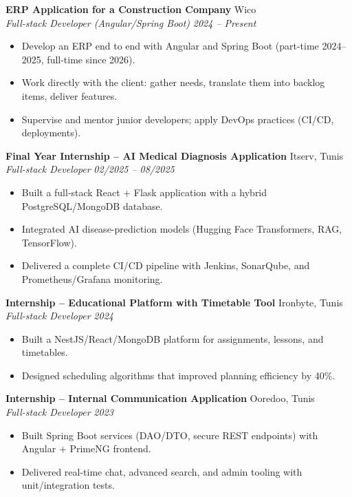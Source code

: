 \documentclass[10pt,a4paper]{article}
\begin{document}
\textbf{ERP Application for a Construction Company} \hfill Wico \\
\textit{Full-stack Developer (Angular/Spring Boot)} \hfill \textit{2024 -- Present}
\begin{itemize}[leftmargin=14pt,itemsep=1pt,topsep=2pt,parsep=0pt]
  \item Develop an ERP end to end with Angular and Spring Boot (part-time 2024--2025, full-time since 2026).
  \item Work directly with the client: gather needs, translate them into backlog items, deliver features.
  \item Supervise and mentor junior developers; apply DevOps practices (CI/CD, deployments).
\end{itemize}

\vspace{3pt}
\textbf{Final Year Internship -- AI Medical Diagnosis Application} \hfill Itserv, Tunis \\
\textit{Full-stack Developer} \hfill \textit{02/2025 -- 08/2025}
\begin{itemize}[leftmargin=14pt,itemsep=1pt,topsep=2pt,parsep=0pt]
  \item Built a full-stack React + Flask application with a hybrid PostgreSQL/MongoDB database.
  \item Integrated AI disease-prediction models (Hugging Face Transformers, RAG, TensorFlow).
  \item Delivered a complete CI/CD pipeline with Jenkins, SonarQube, and Prometheus/Grafana monitoring.
\end{itemize}

\vspace{3pt}
\textbf{Internship -- Educational Platform with Timetable Tool} \hfill Ironbyte, Tunis \\
\textit{Full-stack Developer} \hfill \textit{2024}
\begin{itemize}[leftmargin=14pt,itemsep=1pt,topsep=2pt,parsep=0pt]
  \item Built a NestJS/React/MongoDB platform for assignments, lessons, and timetables.
  \item Designed scheduling algorithms that improved planning efficiency by 40\%.
\end{itemize}

\vspace{3pt}
\textbf{Internship -- Internal Communication Application} \hfill Ooredoo, Tunis \\
\textit{Full-stack Developer} \hfill \textit{2023}
\begin{itemize}[leftmargin=14pt,itemsep=1pt,topsep=2pt,parsep=0pt]
  \item Built Spring Boot services (DAO/DTO, secure REST endpoints) with Angular + PrimeNG frontend.
  \item Delivered real-time chat, advanced search, and admin tooling with unit/integration tests.
\end{itemize}
\end{document}
